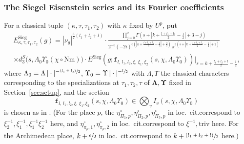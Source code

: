 \documentclass[10pt]{amsart}
\newcommand{\loccit}{loc.\ cit.}
\newcommand{\psfrac}[2]{\sfrac{(#1)}{#2}}
\theoremstyle{plain}
\theoremstyle{remark}
\let\mr\mathrm
\newcommand{\Nm}{\mathrm{Nm}}
\newcommand{\triv}{\mathrm{triv}}
\newcommand{\Sieg}{\mr{Sieg}}
\newcommand{\dsec}{{\texttt f}}
\newcommand{\sPi}{\scriptscriptstyle{\Pi}}
\newcommand{\bLam}{\boldsymbol\Lambda}
\newcommand{\bUps}{\boldsymbol\Upsilon}
\begin{document}
\subsubsection{The Siegel Eisenstein series and its Fourier coefficients}
For a classical tuple $(\kappa,\tau,\tau_1,\tau_2)$ with $\kappa$ fixed by $U^p$, put
\begin{multline*}
E^\Sieg_{\kappa,\tau,\tau_1,\tau_2}(g)= |\nu_g|^{\frac{3}{2}(l_1+l_2+l)}
\cdot \frac{\prod_{j=0}^2\Gamma\left(s+\left|k+\frac{l+l_1+l_2}{2}-\frac{1}{2}\right|+3-j\right)}{2^{-6}(-2i)^{6\left(\left|k+\frac{l+l_1+l_2}{2}-\frac{1}{2}\right|+\frac{3}{2}\right)}\,\pi^{3\left(s+\left|k+\frac{l+l_1+l_2}{2}-\frac{1}{2}\right|+2\right)}}\\
\times d^S_3\bigl(s,\Lambda_0\Upsilon_0(\chi\circ\Nm)\bigr) \cdot
E^{\Sieg}\left(g;\dsec_{l,\,l_1,l_2,\xi,\,\xi_1,\xi_2}(s,\chi,\Lambda_0\Upsilon_0)\right)\Big|_{s=k+\frac{l_1+l_2+l}{2}-\frac{1}{2}},
\end{multline*}
where $\Lambda_0=\Lambda\,|\cdot|^{-\psfrac{l_1+l_2}{2}}$, $\Upsilon_0=\Upsilon \,|\cdot|^{-\sfrac{l}{2}}$ with $\Lambda,\Upsilon$ the classical characters corresponding to the specializations at $\tau_1,\tau_2,\tau$ of $\bLam,\bUps$ fixed in Section~\ref{sec:setup}, and the section
\[
\dsec_{l,\,l_1,l_2,\xi,\,\xi_1,\xi_2}(s,\chi,\Lambda_0\Upsilon_0)\in\bigotimes_v I_v(s,\chi,\Lambda_0\Upsilon_0)
\]
is chosen as in \cite[\S3.3]{pFL}. (For the place $p$, the $\eta^\circ_{\sPi_1,p},\eta^\circ_{\sPi_2,p},\eta^\circ_{\sPi_3,p}$ in \loccit correspond to $\xi^{-1}_2,\xi^{-1}_1,\xi^{-1}_1\xi^{-1}_2$ here, and $\eta^\circ_{\pi_p,1},\eta^\circ_{\pi_p,2}$ in \loccit correspond to $\xi^{-1},\triv$ here. For the Archimedean place, $k+\sfrac{\epsilon}{2}$ in \loccit correspond to $k+\psfrac{l_1+l_2+l}{2}$ here.)
\end{document}
